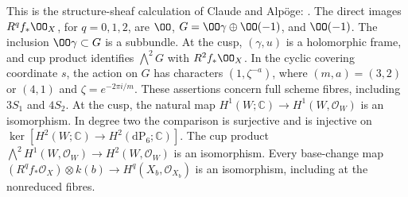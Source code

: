 \begin{proposition}\label{inv:A1.0}\label{wb:thm:structure-direct-images-audit}\label{wb:lem:cusp-structure-sheaf-audit}
This is the structure-sheaf calculation of Claude and Alp\"oge: \cite[Lemma~9.12, pp.~72--74; Proposition~9.13, pp.~74--76, and the base-change clarification on p.~92]{AC2026}. The direct images $R^qf_*\OO_X$, for $q=0,1,2$, are
$\OO$, $G=\OO\gamma\oplus\OO(-1)$, and $\OO(-1)$.
The inclusion $\OO\gamma\subset G$ is a subbundle.  At the cusp,
$(\gamma,u)$ is a holomorphic frame, and cup product identifies
$\bigwedge^2G$ with $R^2f_*\OO_X$.  In the cyclic covering coordinate
$s$, the action on $G$ has characters $(1,\zeta^{-a})$, where
$(m,a)=(3,2)$ or $(4,1)$ and $\zeta=e^{-2\pi i/m}$.
These assertions concern full scheme fibres, including $3S_1$ and $4S_2$.
At the cusp, the natural map $H^1(W;\mathbb C)\to H^1(W,\mathcal O_W)$ is an isomorphism. In degree two the comparison is surjective and is injective on $\ker[H^2(W;\mathbb C)\to H^2(\mathrm{dP}_6;\mathbb C)]$. The cup product $\bigwedge^2H^1(W,\mathcal O_W)\to H^2(W,\mathcal O_W)$ is an isomorphism. Every base-change map $(R^qf_*\mathcal O_X)\otimes k(b)\to H^q(X_b,\mathcal O_{X_b})$ is an isomorphism, including at the nonreduced fibres.
\end{proposition}
